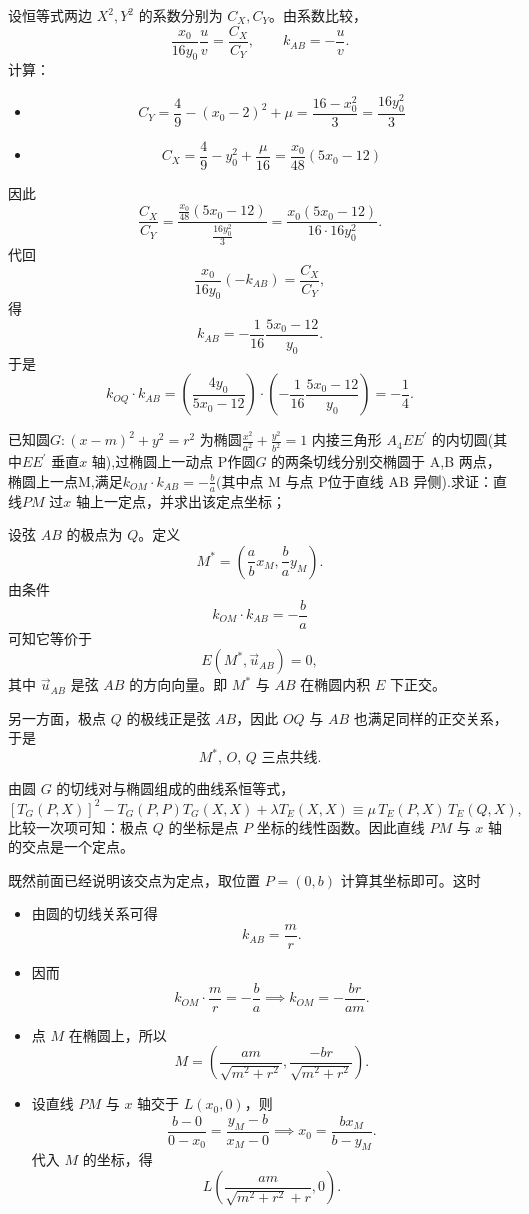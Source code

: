 \begin{solution}
设恒等式两边 $X^2,Y^2$ 的系数分别为 $C_X,C_Y$。由系数比较，
$$\frac{x_0}{16 y_0} \frac{u}{v} = \frac{C_X}{C_Y},\qquad k_{AB} = -\frac{u}{v}.$$
计算：
\begin{itemize}
\item $$C_Y = \frac{4}{9} - (x_0-2)^2 + \mu = \frac{16 - x_0^2}{3} = \frac{16y_0^2}{3}$$
\item $$C_X = \frac{4}{9} - y_0^2 + \frac{\mu}{16} = \frac{x_0}{48}(5x_0 - 12)$$
\end{itemize}
因此
$$\frac{C_X}{C_Y} = \frac{\frac{x_0}{48}(5x_0 - 12)}{\frac{16y_0^2}{3}} = \frac{x_0(5x_0 - 12)}{16 \cdot 16 y_0^2}.$$
代回
$$\frac{x_0}{16 y_0} (-k_{AB}) = \frac{C_X}{C_Y},$$
得
$$k_{AB} = -\frac{1}{16} \frac{5x_0 - 12}{y_0}.$$
于是
$$k_{OQ} \cdot k_{AB} = \left( \frac{4y_0}{5x_0 - 12} \right) \cdot \left( -\frac{1}{16} \frac{5x_0 - 12}{y_0} \right) = -\frac{1}{4}.$$
\end{solution}

\begin{exercise}
    已知圆$G:(x-m)^2+y^2=r^2$ 为椭圆$\frac{x^2}{a^2}+\frac{y^2}{b^2}=1$ 内接三角形 $A_{4}EE^{\prime}$ 的内切圆(其中$EE^{\prime}$ 垂直$x$ 轴),过椭圆上一动点 P作圆$G$ 的两条切线分别交椭圆于 A,B 两点，椭圆上一点M,满足$k_{OM}\cdot k_{AB}=-\frac{b}{a}($其中点 M 与点 P位于直线 AB 异侧).求证：直线$PM$ 过$x$ 轴上一定点，并求出该定点坐标；
\end{exercise}
\begin{solution}
设弦 $AB$ 的极点为 $Q$。定义
$$M^* = \left(\frac{a}{b}x_M, \frac{b}{a}y_M\right).$$
由条件
$$k_{OM}\cdot k_{AB}=-\frac{b}{a}$$
可知它等价于
$$E(M^*, \vec{u}_{AB}) = 0,$$
其中 $\vec{u}_{AB}$ 是弦 $AB$ 的方向向量。即 $M^*$ 与 $AB$ 在椭圆内积 $E$ 下正交。

另一方面，极点 $Q$ 的极线正是弦 $AB$，因此 $OQ$ 与 $AB$ 也满足同样的正交关系，于是
$$M^*,\,O,\,Q \text{ 三点共线}.$$

由圆 $G$ 的切线对与椭圆组成的曲线系恒等式，
$$[T_G(P,X)]^2 - T_G(P,P)T_G(X,X) + \lambda T_E(X,X) \equiv \mu \, T_E(P,X)\,T_E(Q,X),$$
比较一次项可知：极点 $Q$ 的坐标是点 $P$ 坐标的线性函数。因此直线 $PM$ 与 $x$ 轴的交点是一个定点。

既然前面已经说明该交点为定点，取位置 $P=(0,b)$ 计算其坐标即可。这时
\begin{itemize}
\item 由圆的切线关系可得
$$k_{AB} = \frac{m}{r}.$$
\item 因而
$$k_{OM} \cdot \frac{m}{r} = -\frac{b}{a}\implies k_{OM} = -\frac{br}{am}.$$
\item 点 $M$ 在椭圆上，所以
$$M = \left( \frac{am}{\sqrt{m^2+r^2}}, \frac{-br}{\sqrt{m^2+r^2}} \right).$$
\item 设直线 $PM$ 与 $x$ 轴交于 $L(x_0, 0)$，则
$$\frac{b-0}{0-x_0} = \frac{y_M-b}{x_M-0} \implies x_0 = \frac{bx_M}{b-y_M}.$$
代入 $M$ 的坐标，得
$$L \left( \frac{am}{\sqrt{m^2+r^2} + r}, 0 \right).$$
\end{itemize}
\end{solution}

